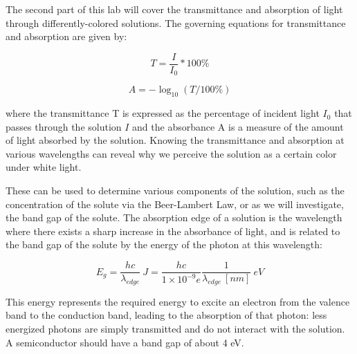 The second part of this lab will cover the transmittance and absorption of light through differently-colored solutions. The governing equations for transmittance and absorption are given by:

\begin{equation}
   T = \frac{I}{I_0} * 100\%
\end{equation}

\begin{equation}
   A = -\log_{10}(T/100\%)
\end{equation}

where the transmittance T is expressed as the percentage of incident light $I_0$ that passes through the solution $I$ and the absorbance A is a measure of the amount of light absorbed by the solution. Knowing the transmittance and absorption at various wavelengths can reveal why we perceive the solution as a certain color under white light.

These can be used to determine various components of the solution, such as the concentration of the solute via the Beer-Lambert Law, or as we will investigate, the band gap of the solute. The absorption edge of a solution is the wavelength where there exists a sharp increase in the absorbance of light, and is related to the band gap of the solute by the energy of the photon at this wavelength:

\begin{equation}
   E_g = \frac{hc}{\lambda_{edge}}~J = \frac{hc}{1\times10^{-9} e} \frac{1}{\lambda_{edge}~[nm]} ~eV
\end{equation}

This energy represents the required energy to excite an electron from the valence band to the conduction band, leading to the absorption of that photon: less energized photons are simply transmitted and do not interact with the solution. A semiconductor should have a band gap of about 4 eV. 